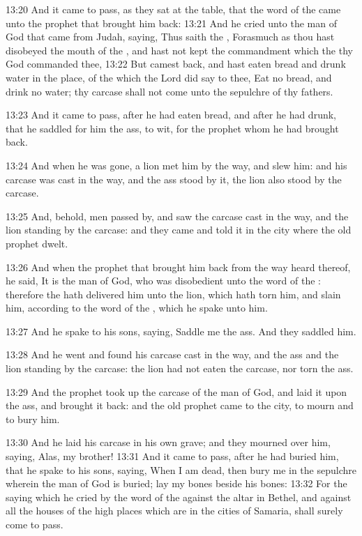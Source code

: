 13:20 And it came to pass, as they sat at the table, that the word of the \LORD came unto the prophet that brought him back: 13:21 And he cried unto the man of God that came from Judah, saying, Thus saith the \LORD, Forasmuch as thou hast disobeyed the mouth of the \LORD, and hast not kept the commandment which the \LORD thy God commanded thee, 13:22 But camest back, and hast eaten bread and drunk water in the place, of the which the Lord did say to thee, Eat no bread, and drink no water; thy carcase shall not come unto the sepulchre of thy fathers.

13:23 And it came to pass, after he had eaten bread, and after he had drunk, that he saddled for him the ass, to wit, for the prophet whom he had brought back.

13:24 And when he was gone, a lion met him by the way, and slew him: and his carcase was cast in the way, and the ass stood by it, the lion also stood by the carcase.

13:25 And, behold, men passed by, and saw the carcase cast in the way, and the lion standing by the carcase: and they came and told it in the city where the old prophet dwelt.

13:26 And when the prophet that brought him back from the way heard thereof, he said, It is the man of God, who was disobedient unto the word of the \LORD: therefore the \LORD hath delivered him unto the lion, which hath torn him, and slain him, according to the word of the \LORD, which he spake unto him.

13:27 And he spake to his sons, saying, Saddle me the ass. And they saddled him.

13:28 And he went and found his carcase cast in the way, and the ass and the lion standing by the carcase: the lion had not eaten the carcase, nor torn the ass.

13:29 And the prophet took up the carcase of the man of God, and laid it upon the ass, and brought it back: and the old prophet came to the city, to mourn and to bury him.

13:30 And he laid his carcase in his own grave; and they mourned over him, saying, Alas, my brother!  13:31 And it came to pass, after he had buried him, that he spake to his sons, saying, When I am dead, then bury me in the sepulchre wherein the man of God is buried; lay my bones beside his bones: 13:32 For the saying which he cried by the word of the \LORD against the altar in Bethel, and against all the houses of the high places which are in the cities of Samaria, shall surely come to pass.

